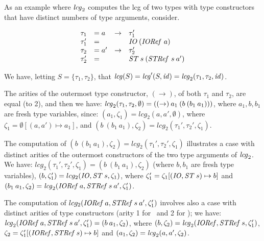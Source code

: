 \begin{Example}
\label{ex2-lcg}
\normalfont
As an example where ${\it lcg\/}_2$ computes the lcg of two types with type
constructors that have distinct numbers of type arguments, consider.

  \[ \begin{array}[t]{llll}
    \tau_1  & = a  & \rightarrow  & \tau_1' \\
    \tau_1' & = &                 & {\it IO\/}\: ({\it IORef\/}\ a) \\
    \tau_2   & = a' & \rightarrow & \tau_2'\\
    \tau_2'  & =    &             & {\it ST\/}\: s\: ({\it STRef\/}\ s\: a')
  \end{array}
  \]

  We have, letting $S = \{ \tau_1, \tau_2\}$, that ${\it lcg\/}(S) = {\it lcg\/}'(S,
  {\it id\/}) = {\it lcg\/}_2(\tau_1, \tau_2, {\it id\/})$.

The arities of the outermost type constructor, $(\rightarrow)$, of
both $\tau_1$ and $\tau_2$, are equal (to 2), and then we have:
${\it lcg\/}_2(\tau_1, \tau_2, \emptyset) = ((\rightarrow)\: a_1\: (b\:
(b_1\: a_1)))$, where $a_1,b,b_1$ are fresh type variables, since:
$(a_1, \zeta_1) = lcg_2(a, a', \emptyset)$, where $\zeta_1 = \emptyset
[(a,a')\mapsto a_1]$, and $(b\: (b_1\: a_1), \zeta_2) = lcg_2(\tau_1',
\tau_2',\zeta_1)$.

The computation of $(b\: (b_1\: a_1), \zeta_2) = lcg_2(\tau_1',
\tau_2', \zeta_1)$ illustrates a case with distinct arities of the
outermost constructors of the two type arguments of ${\it lcg\/}_2$.  We
have: $lcg_2(\tau_1', \tau_2', \zeta_1) = (b\: (b_1\: a_1), \zeta_2)$
(where $b, b_1$ are fresh type variables), $(b, \zeta_1') = lcg_2({\it IO\/},
{\it ST\/}\: s, \zeta_1)$, where $\zeta_1' = \zeta_1[({\it IO\/}, {\it ST\/}\: s) \mapsto
  b]$ and $(b_1 \: a_1, \zeta_2) = {\it lcg\/}_2({\it IORef\/}\: a, {\it STRef\/}\: s\: a',
\zeta_1')$.

The computation of $lcg_2({\it IORef\/}\: a, {\it STRef\/}\: s\: a', \zeta_1')$
involves also a case with distinct arities of type constructors (arity
1 for \IORef\ and 2 for \STRef); we have: ${\it lcg\/}_2({\it IORef\/}\: a, {\it STRef\/}\:
s\: a', \zeta_1') = (b\: a_1, \zeta_2)$, where $(b, \zeta_2) =
{\it lcg\/}_2({\it IORef\/}, {\it STRef\/}\: s, \zeta_1')$, $\zeta_2 = \zeta_1'[({\it IORef\/},
  {\it STRef\/}\: s)\mapsto b]$ and $(a_1, \zeta_2) = {\it lcg\/}_2(a, a',\zeta_2)$.
     
\end{Example}

